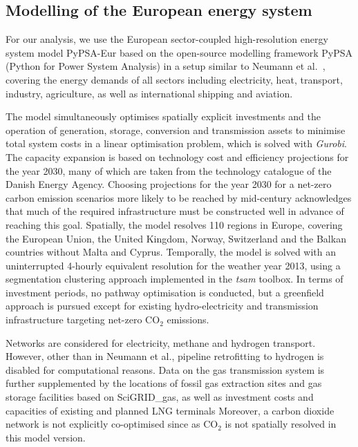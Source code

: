 

\subsection*{Modelling of the European energy system}

For our analysis, we use the European sector-coupled high-resolution energy
system model PyPSA-Eur\cite{horschPyPSAEurOpen2018a} based on the open-source
modelling framework PyPSA\cite{brownPyPSAPython2018} (Python for Power System
Analysis) in a setup similar to Neumann et al.~\cite{neumannPotentialRole2023},
covering the energy demands of all sectors including electricity, heat,
transport, industry, agriculture, as well as international shipping and
aviation.

The model simultaneously optimises spatially explicit investments and the
operation of generation, storage, conversion and transmission assets to minimise
total system costs in a linear optimisation problem, which is solved with
\textit{Gurobi}.\cite{gurobi} The capacity expansion is based on technology cost
and efficiency projections for the year 2030, many of which are taken from the
technology catalogue of the Danish Energy Agency.\cite{DEA} Choosing projections
for the year 2030 for a net-zero carbon emission scenarios more likely to be
reached by mid-century acknowledges that much of the required infrastructure
must be constructed well in advance of reaching this goal. Spatially, the model
resolves 110 regions in Europe,\cite{frysztackiStrongEffect2021} covering the
European Union, the United Kingdom, Norway, Switzerland and the Balkan countries
without Malta and Cyprus. Temporally, the model is solved with an uninterrupted
4-hourly equivalent resolution for the weather year 2013, using a segmentation
clustering approach implemented in the \textit{tsam}
toolbox.\cite{hoffmannParetooptimalTemporal2022} In terms of investment periods,
no pathway optimisation is conducted, but a greenfield approach is pursued
except for existing hydro-electricity and transmission infrastructure targeting
net-zero CO$_2$ emissions.

Networks are considered for electricity, methane and hydrogen
transport.\cite{ENTSOE,plutaSciGRIDGas2022a} However, other than in Neumann et
al.,\cite{neumannPotentialRole2023} pipeline retrofitting to hydrogen is
disabled for computational reasons. Data on the gas transmission system is
further supplemented by the locations of fossil gas extraction sites and gas
storage facilities based on SciGRID\_gas,\cite{plutaSciGRIDGas2022a} as well as
investment costs and capacities of existing and planned LNG
terminals\cite{instituteforenergyeconomicsandfinancialanalysisEuropeanLNG2023}
Moreover, a carbon dioxide network is not explicitly co-optimised since as CO$_2$ is
not spatially resolved in this model version.\cite{hofmannDesigningCO22023}

